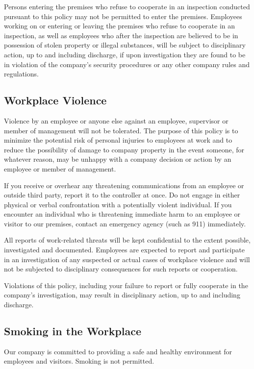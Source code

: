 Persons entering the premises who refuse to cooperate in an inspection conducted pursuant to this policy may not be permitted to enter the premises. Employees working on or entering or leaving the premises who refuse to cooperate in an inspection, as well as employees who after the inspection are believed to be in possession of stolen property or illegal substances, will be subject to disciplinary action, up to and including discharge, if upon investigation they are found to be in violation of the company's security procedures or any other company rules and regulations.	

\subsection{Workplace Violence}

Violence by an employee or anyone else against an employee, supervisor or member of management will not be tolerated. The purpose of this policy is to minimize the potential risk of personal injuries to employees at work and to reduce the possibility of damage to company property in the event someone, for whatever reason, may be unhappy with a company decision or action by an employee or member of management.

If you receive or overhear any threatening communications from an employee or outside third party, report it to the controller at once. Do not engage in either physical or verbal confrontation with a potentially violent individual. If you encounter an individual who is threatening immediate harm to an employee or visitor to our premises, contact an emergency agency (such as 911) immediately.

All reports of work-related threats will be kept confidential to the extent possible, investigated and documented. Employees are expected to report and participate in an investigation of any suspected or actual cases of workplace violence and will not be subjected to disciplinary consequences for such reports or cooperation.

Violations of this policy, including your failure to report or fully cooperate in the company's investigation, may result in disciplinary action, up to and including discharge.

\subsection{Smoking in the Workplace}

Our company is committed to providing a safe and healthy environment for employees and visitors. Smoking is not permitted.

